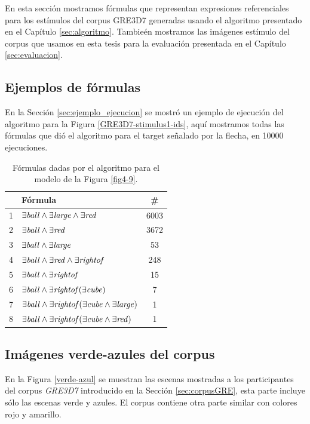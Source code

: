 En esta secci\'on mostramos f\'ormulas que representan expresiones referenciales para los est\'imulos del corpus GRE3D7 generadas usando el algoritmo presentado en el Cap\'itulo \ref{sec:algoritmo}. Tambie\'en mostramos las im\'agenes est\'imulo del corpus que usamos en esta tesis para la evaluaci\'on presentada en el Cap\'itulo \ref{sec:evaluacion}. 

\subsection{Ejemplos de f\'ormulas}
\label{formulas-gre3d7}

En la Secci\'on \ref{sec:ejemplo_ejecucion} se mostr\'o un ejemplo de ejecuci\'on del algoritmo para la Figura \ref{GRE3D7-stimulus1-ids}, aqu\'i mostramos todas las f\'ormulas que di\'o el algoritmo para el target se\~nalado por la flecha, en 10000 ejecuciones.


\begin{table}[h]
\begin{center}
\begin{tabular}{|l|l|c|}
\hline
&F\'ormula			      &  \# \\ \hline \hline

1&$\exists \mathit{ball} \land \exists \mathit{large} \land \exists \mathit{red}$		&6003 \\ \hline
2&$\exists \mathit{ball} \land \exists \mathit{red}$		&3672 \\ \hline
3&$\exists \mathit{ball} \land \exists \mathit{large}$		&53 \\ \hline
4&$\exists \mathit{ball} \land \exists \mathit{red} \land \exists \mathit{rightof}$	&	248 \\ \hline
5&$\exists \mathit{ball} \land \exists \mathit{rightof}$		&15 \\ \hline
6&$\exists \mathit{ball} \land \exists \mathit{rightof}(\exists \mathit{cube})$	&	7 \\ \hline
7&$\exists \mathit{ball} \land \exists \mathit{rightof}(\exists \mathit{cube} \land \exists \mathit{large})$&		1 \\ \hline
8&$\exists \mathit{ball} \land \exists \mathit{rightof}(\exists \mathit{cube} \land \exists \mathit{red})$		&1 \\ \hline

\end{tabular}

\caption{F\'ormulas dadas por el algoritmo para el modelo de la Figura \protect\ref{fig4-9}.}\label{formulas-mapa-gre3d7-apendice}
\end{center}
\end{table}

\subsection{Im\'agenes verde-azules del corpus}
\label{imagenesGRE3D7-apendice}
En la Figura \ref{verde-azul} se muestran las escenas mostradas a los participantes del corpus \textit{GRE3D7} introducido en la Secci\'on \ref{sec:corpusGRE}, esta parte incluye s\'olo las escenas verde y azules. El corpus contiene otra parte similar con colores rojo y amarillo.

